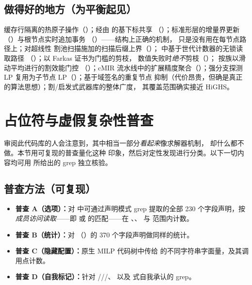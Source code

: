 \documentclass[11pt]{ctexart}
\begin{document}
\subsection{做得好的地方（为平衡起见）}
\label{sec:good}
缓存行隔离的热原子操作（）；经由
 的基下标共享
（）；标准形层的增量界更新
（）与根节点实时追加事务
（）——结构上正确的机制，
只是没有用在每节点路径上；对超线性
割池扫描施加的扫描后缀上界（）；
 中基于世代计数器的无锁读取路径
（）；以 Farkas 证书为门槛的剪枝，
数值失败时\emph{绝不}剪枝（）；
按族以滑动平均进行的割效能门控
（）；cMIR
流水线中的扩展精度聚合（）；强分支探测 LP
复用为子节点 LP（）；基于域签名的重复节点
抑制（代价昂贵，但确是真正的算法思想）；割/启发式武器库的整体广度，
其覆盖范围确实接近 HiGHS。

\section{占位符与虚假复杂性普查}
\label{sec:placeholders}

审阅此代码库的人会注意到，其中相当一部分\emph{看起来}像求解器机制，
却什么都不做。本节用可复现的普查量化这种
印象，然后对定性发现进行分类。以下一切内容均可用
所给出的 grep 独立核验。

\subsection{普查方法（可复现）}
\label{sec:census-method}
\begin{itemize}[nosep]
\item \textbf{普查 A（选项）：}对  中可通过声明模式 grep 提取的全部 230
  个字段声明，按\emph{成员访问读取}——即
   或  的匹配——在
  、、 与
   范围内计数。
\item \textbf{普查 B（统计）：}对 （）的 370
  个字段声明做同样的统计。
\item \textbf{普查 C（隐藏配置）：}原生 MILP 代码树中传给
   的不同字符串字面量，及其调用点计数。
\item \textbf{普查 D（自我标记）：}针对
  ///、 以及
   式自我承认的 grep。
\end{itemize}
\end{document}
